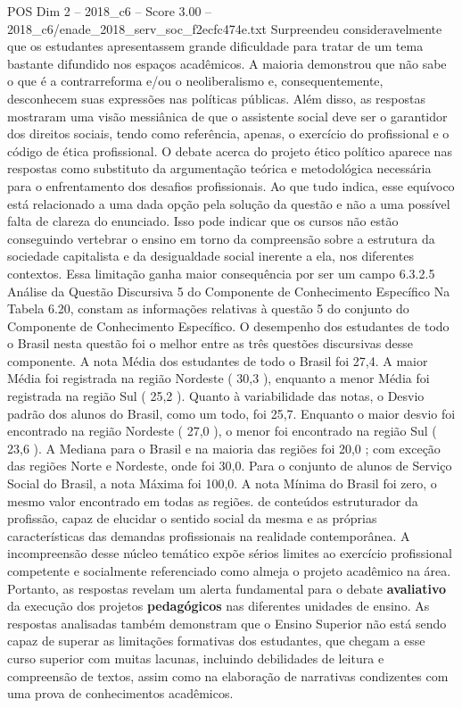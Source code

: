 \begin{textsample}{POS Dim 2 – 2018\_c6 – Score 3.00 – 2018\_c6/enade\_2018\_serv\_soc\_f2ecfc474e.txt}
Surpreendeu consideravelmente que os estudantes apresentassem grande dificuldade para tratar de um tema bastante difundido nos espaços acadêmicos.
A maioria demonstrou que não sabe o que é a contrarreforma e/ou o neoliberalismo e, consequentemente, desconhecem suas expressões nas políticas públicas.
Além disso, as respostas mostraram uma visão messiânica de que o assistente social deve ser o garantidor dos direitos sociais, tendo como referência, apenas, o exercício do profissional e o código de ética profissional.
O debate acerca do projeto ético político aparece nas respostas como substituto da argumentação teórica e metodológica necessária para o enfrentamento dos desafios profissionais.
Ao que tudo indica, esse equívoco está relacionado a uma dada opção pela solução da questão e não a uma possível falta de clareza do enunciado.
Isso pode indicar que os cursos não estão conseguindo vertebrar o ensino em torno da compreensão sobre a estrutura da sociedade capitalista e da desigualdade social inerente a ela, nos diferentes contextos.
Essa limitação ganha maior consequência por ser um campo 6.3.2.5 Análise da Questão Discursiva 5 do Componente de Conhecimento Específico Na Tabela 6.20, constam as informações relativas à questão 5 do conjunto do Componente de Conhecimento Específico.
O desempenho dos estudantes de todo o Brasil nesta questão foi o melhor entre as três questões discursivas desse componente.
A nota Média dos estudantes de todo o Brasil foi 27,4.
A maior Média foi registrada na região Nordeste ( 30,3 ), enquanto a menor Média foi registrada na região Sul ( 25,2 ).
Quanto à variabilidade das notas, o Desvio padrão dos alunos do Brasil, como um todo, foi 25,7.
Enquanto o maior desvio foi encontrado na região Nordeste ( 27,0 ), o menor foi encontrado na região Sul ( 23,6 ).
A Mediana para o Brasil e na maioria das regiões foi 20,0 ; com exceção das regiões Norte e Nordeste, onde foi 30,0.
Para o conjunto de alunos de Serviço Social do Brasil, a nota Máxima foi 100,0.
A nota Mínima do Brasil foi zero, o mesmo valor encontrado em todas as regiões. de conteúdos estruturador da profissão, capaz de elucidar o sentido social da mesma e as próprias características das demandas profissionais na realidade contemporânea.
A incompreensão desse núcleo temático expõe sérios limites ao exercício profissional competente e socialmente referenciado como almeja o projeto acadêmico na área.
Portanto, as respostas revelam um alerta fundamental para o debate \textbf{avaliativo} da execução dos projetos \textbf{pedagógicos} nas diferentes unidades de ensino.
As respostas analisadas também demonstram que o Ensino Superior não está sendo capaz de superar as limitações formativas dos estudantes, que chegam a esse curso superior com muitas lacunas, incluindo debilidades de leitura e compreensão de textos, assim como na elaboração de narrativas condizentes com uma prova de conhecimentos acadêmicos.

\end{textsample}
